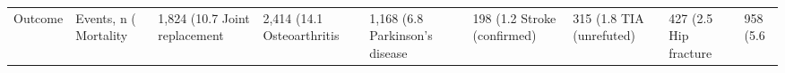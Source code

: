 \begin{tabular}{lll}
\toprule
Outcome & Events, n (%
\midrule
Mortality & 1,824 (10.7%
Joint replacement & 2,414 (14.1%
Osteoarthritis & 1,168 (6.8%
Parkinson's disease & 198 (1.2%
Stroke (confirmed) & 315 (1.8%
TIA (unrefuted) & 427 (2.5%
Hip fracture & 958 (5.6%
\bottomrule
\end{tabular}
